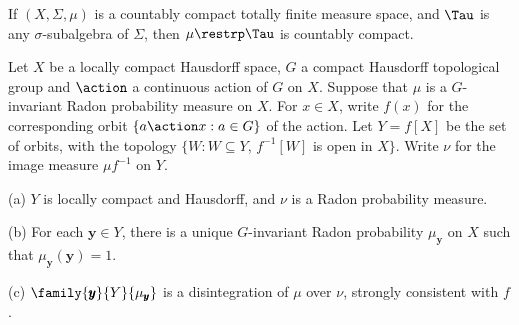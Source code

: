  If
$(X,\Sigma,\mu)$ is a countably compact totally finite measure space,
and $\Tau$ is any $\sigma$-subalgebra of $\Sigma$, then $\mu\restrp\Tau$
is countably compact.

 Let $X$ be a locally compact Hausdorff space, $G$ a
compact Hausdorff topological group and $\action$ a continuous action of
$G$ on $X$.   Suppose that $\mu$ is a $G$-invariant
Radon probability measure on $X$.
For $x\in X$, write $f(x)$ for the corresponding
orbit $\{a\action x:a\in G\}$ of the
action.   Let $Y=f[X]$ be the set of orbits, with the topology
$\{W:W\subseteq Y$, $f^{-1}[W]$ is open in $X\}$.
Write $\nu$ for the image measure $\mu f^{-1}$ on $Y$.

(a) $Y$ is locally compact and
Hausdorff, and $\nu$ is a Radon probability measure.

(b) For each $\pmb{y}\in Y$, there is a unique $G$-invariant Radon
probability $\mu_{\pmb{y}}$ on $X$ such that $\mu_{\pmb{y}}(\pmb{y})=1$.

(c) $\family{\pmb{y}}{Y}{\mu_{\pmb{y}}}$ is a
disintegration of $\mu$ over $\nu$, strongly consistent with $f$.

